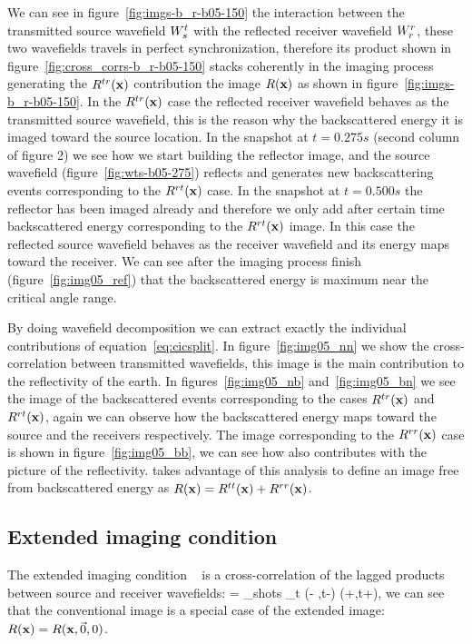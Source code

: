 We can see in figure~\ref{fig:imgs-b_r-b05-150} the interaction between the transmitted source wavefield ${W_s^t}$ with 
the reflected receiver wavefield ${W_r^r}$, these two wavefields travels in perfect synchronization, therefore its product 
shown in figure~\ref{fig:cross_corrs-b_r-b05-150} stacks coherently in the imaging process generating the $R^{tr}({\bf x})$ 
contribution the image $R({\bf x})$ as shown in figure~\ref{fig:imgs-b_r-b05-150}. In the $R^{tr}({\bf x})$ case the reflected 
receiver wavefield behaves as the transmitted source wavefield, this is the reason why the backscattered energy 
it is imaged toward the source location. 
In the snapshot at $t=0.275s$ (second column of figure 2) we see how we start building the reflector image,
 and the source wavefield (figure~\ref{fig:wts-b05-275}) reflects and generates new backscattering events
 corresponding to the  $R^{rt}({\bf x})$ case. In the snapshot at $t=0.500s$ the reflector has been imaged already and 
therefore we only add after certain time backscattered energy corresponding to the $R^{rt}({\bf x})$ image. In this case the 
reflected source wavefield behaves as the receiver wavefield and its energy maps toward the receiver. We can see after
 the imaging process finish (figure~\ref{fig:img05_ref}) that the backscattered energy is maximum near the critical
 angle range.

By doing wavefield decomposition we can extract exactly the individual contributions of equation~\ref{eq:cicsplit}. In 
figure~\ref{fig:img05_nn} we show the cross-correlation between transmitted wavefields, this image is the main contribution
to the reflectivity of the earth. In figures~\ref{fig:img05_nb} and~\ref{fig:img05_bn} we see the image of the backscattered
events corresponding to the cases $R^{tr}({\bf x})$ and $R^{rt}({\bf x})$, again we can observe how the backscattered energy
maps toward the source and the receivers respectively. The image corresponding to the $R^{rr}({\bf x})$ case is shown in 
figure~\ref{fig:img05_bb}, we can see how also contributes with the picture of the reflectivity. \cite{fei:3130} takes 
advantage of this analysis to define an image free from backscattered energy as $R({\bf x})=R^{tt}({\bf x})+R^{rr}({\bf x})$.

\subsection{Extended imaging condition}

The extended imaging condition ~\citep{sava:S209} is a cross-correlation of the lagged products between source
and receiver wavefields:
\beq
\Re= \sum_{shots} \sum_{t} \US(\xx - \hh,t-\tau) \UR(\xx+\hh,t+\tau),
\label{eq:eic}
\eeq
we can see that the conventional image is a special case of the extended image: $R({\bf x})=R({\bf x},\vec{0},0)$.

